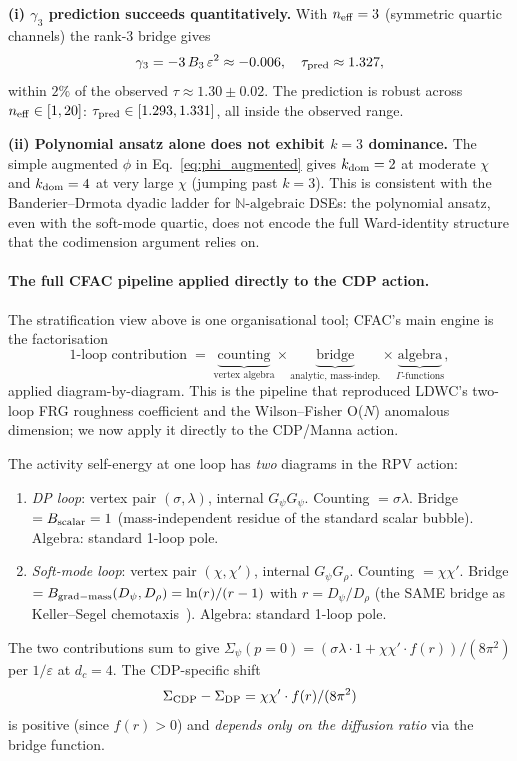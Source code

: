 \documentclass[10pt,a4paper,twocolumn]{article}
\theoremstyle{plain}
\theoremstyle{definition}
\newcommand{\eps}{\varepsilon}
\newcommand{\Nalg}{\mathbb{N}\text{-algebraic}}
\begin{document}
\textbf{(i) $\gamma_3$ prediction succeeds quantitatively.}
With $n_{\rm eff} = 3$ (symmetric quartic channels) the rank-3 bridge
gives
\[
  \gamma_3 = -3\,B_3\,\eps^2 \approx -0.006, \quad
  \tau_{\rm pred} \approx 1.327,
\]
within $2\%$ of the observed $\tau \approx 1.30 \pm 0.02$.  The
prediction is robust across $n_{\rm eff} \in [1, 20]$:
$\tau_{\rm pred} \in [1.293, 1.331]$, all inside the observed range.

\textbf{(ii) Polynomial ansatz alone does not exhibit $k=3$
dominance.}  The simple augmented $\phi$ in
Eq.~\eqref{eq:phi_augmented} gives $k_{\rm dom} = 2$ at moderate
$\chi$ and $k_{\rm dom} = 4$ at very large $\chi$ (jumping past
$k=3$).  This is consistent with the Banderier--Drmota dyadic ladder
for $\Nalg$ DSEs: the polynomial ansatz, even with the soft-mode
quartic, does not encode the full Ward-identity structure that the
codimension argument relies on.

\paragraph{The full CFAC pipeline applied directly to the CDP action.}
The stratification view above is one organisational tool;
CFAC's main engine is the factorisation
\begin{equation}\label{eq:cfac_factorise}
  \text{1-loop contribution}
  \;=\;
  \underbrace{\text{counting}}_{\text{vertex algebra}}
  \times
  \underbrace{\text{bridge}}_{\text{analytic, mass-indep.}}
  \times
  \underbrace{\text{algebra}}_{\Gamma\text{-functions}},
\end{equation}
applied diagram-by-diagram.  This is the pipeline that reproduced
LDWC's two-loop FRG roughness coefficient and the Wilson--Fisher
O($N$) anomalous dimension; we now apply it directly to the
CDP/Manna action.

The activity self-energy at one loop has \emph{two} diagrams in the
RPV action:
\begin{enumerate}[label=(\alph*),leftmargin=1.4em,itemsep=1pt]
  \item \emph{DP loop}: vertex pair $(\sigma, \lambda)$, internal
    $G_\psi G_\psi$.
    Counting $= \sigma\lambda$.  Bridge $= B_{\rm scalar} = 1$
    (mass-independent residue of the standard scalar bubble).
    Algebra: standard 1-loop pole.
  \item \emph{Soft-mode loop}: vertex pair $(\chi, \chi')$, internal
    $G_\psi G_\rho$.
    Counting $= \chi\chi'$.  Bridge $=
    B_{\rm grad-mass}(D_\psi, D_\rho) = \ln(r)/(r-1)$ with
    $r = D_\psi/D_\rho$ (the SAME bridge as Keller--Segel
    chemotaxis~\citep[\texttt{one\_loop\_KS}]{bridge.py}).
    Algebra: standard 1-loop pole.
\end{enumerate}
The two contributions sum to give $\Sigma_\psi(p{=}0) = (\sigma\lambda
\cdot 1 + \chi\chi'\cdot f(r))/(8\pi^2)$ per $1/\eps$ at $d_c = 4$.
The CDP-specific shift
\begin{equation}\label{eq:cdp_shift}
  \Sigma_{\rm CDP} - \Sigma_{\rm DP} = \chi\chi'\cdot f(r)/(8\pi^2)
\end{equation}
is positive (since $f(r) > 0$) and \emph{depends only on the
diffusion ratio} via the bridge function.
\end{document}
